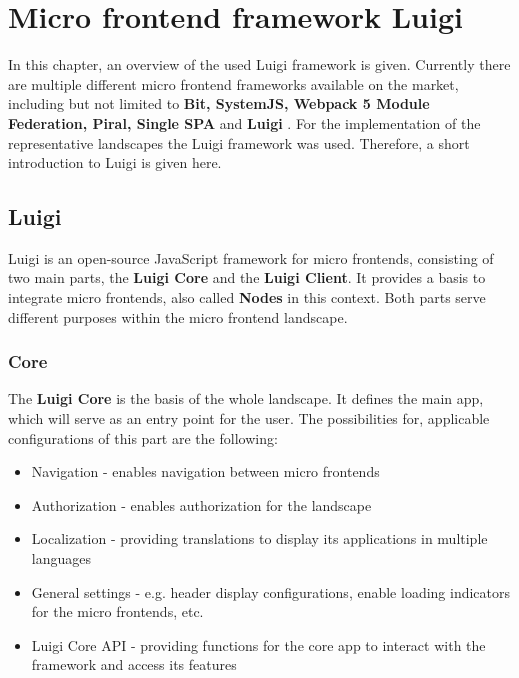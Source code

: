 \chapter{Micro frontend framework Luigi} %
\label{Chapter2}


In this chapter, an overview of the used Luigi framework is given. Currently there are multiple different micro frontend frameworks available on the market, including but not limited to \textbf{Bit, SystemJS, Webpack 5 Module Federation, Piral, Single SPA} and \textbf{Luigi} \cite{top10_mffs}.
For the implementation of the representative landscapes the Luigi framework was used. Therefore, a short introduction to Luigi is given here.

\section{Luigi}

Luigi is an open-source JavaScript framework for micro frontends, consisting of two main parts, the \textbf{Luigi Core} and the \textbf{Luigi Client}. It provides a basis to integrate micro frontends, also called \textbf{Nodes} in this context. Both parts serve different purposes within the micro frontend landscape.\cite{luigi_doc_overview}

\subsection{Core}

The \textbf{Luigi Core} is the basis of the whole landscape. It defines the main app, which will serve as an entry point for the user. The possibilities for, applicable configurations of this part are the following:

\begin{itemize}[noitemsep]
	\item Navigation - enables navigation between micro frontends
	\item Authorization - enables authorization for the landscape
	\item Localization - providing translations to display its applications in multiple languages
	\item General settings - e.g. header display configurations, enable loading indicators for the micro frontends, etc.
	\item Luigi Core API - providing functions for the core app to interact with the framework and access its features
\end{itemize} 

